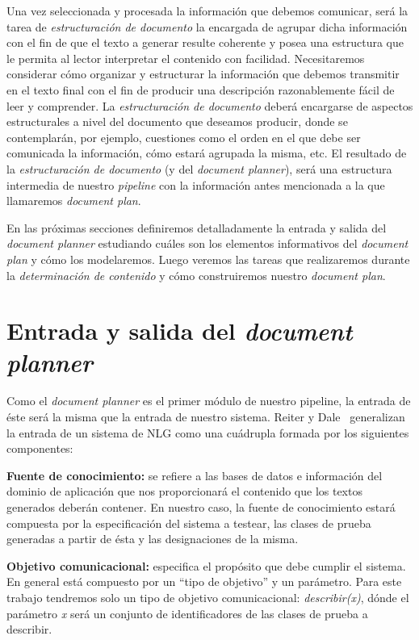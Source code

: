 Una vez seleccionada y procesada la información que debemos comunicar, será la tarea de \emph{estructuración de documento} la encargada de agrupar dicha información con el fin de que el texto a generar resulte coherente y posea una estructura que le permita al lector interpretar el contenido con facilidad. Necesitaremos considerar cómo organizar y estructurar la información que debemos transmitir en el texto final con el fin de producir una descripción razonablemente fácil de leer y comprender. La \emph{estructuración de documento} deberá encargarse de aspectos estructurales a nivel del documento que deseamos producir, donde se contemplarán, por ejemplo, cuestiones como el orden en el que debe ser comunicada la información, cómo estará agrupada la misma, etc. El resultado de la \emph{estructuración de documento} (y del \textit{document planner}), será una estructura intermedia de nuestro \textit{pipeline} con la información antes mencionada a la que llamaremos \emph{document plan}. 

En las próximas secciones definiremos detalladamente la entrada y salida del \textit{document planner} estudiando cuáles son los elementos informativos del \emph{document plan} y cómo los modelaremos. Luego veremos las tareas que realizaremos durante la \emph{determinación de contenido} y cómo construiremos nuestro \textit{document plan}. 

\section{Entrada y salida del \textit{document planner}}
Como el \textit{document planner} es el primer módulo de nuestro pipeline, la entrada de éste será la misma que la entrada de nuestro sistema. Reiter y Dale~\cite{reiter_dale} generalizan la entrada de un sistema de NLG como una cuádrupla formada por los siguientes componentes:

\bigskip
\noindent
\textbf{Fuente de conocimiento:} se refiere a las bases de datos e información del dominio de aplicación que nos proporcionará el contenido que los textos generados deberán contener.
En nuestro caso, la fuente de conocimiento estará compuesta por la especificación del sistema a testear, las clases de prueba generadas a partir de ésta y las designaciones de la misma. 

\bigskip
\noindent
\textbf{Objetivo comunicacional:} especifica el propósito que debe cumplir el sistema. En general está compuesto por un ``tipo de objetivo'' y un parámetro.
Para este trabajo tendremos solo un tipo de objetivo comunicacional: \emph{describir(x)}, dónde el parámetro \emph{x} será un conjunto de identificadores de las clases de prueba a describir.

